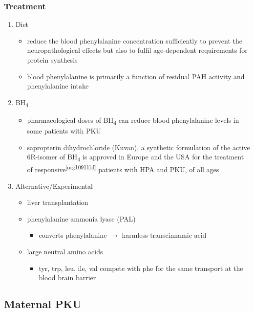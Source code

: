 \documentclass{scrartcl}
\begin{document}
\subsubsection{Treatment}
\label{sec:orgc63a69c}
\begin{enumerate}
\item Diet
\label{sec:orgd72f40e}
\begin{itemize}
\item reduce the blood phenylalanine concentration sufficiently to prevent the
neuropathological effects but also to fulfil age-dependent
requirements for protein synthesis
\item blood phenylalanine is primarily a function of residual PAH activity and phenylalanine
intake
\end{itemize}
\item BH\textsubscript{4}
\label{sec:org8cec840}
\begin{itemize}
\item pharmacological doses of BH\textsubscript{4} can reduce blood phenylalanine levels
in some patients with PKU
\item sapropterin dihydrochloride (Kuvan), a synthetic formulation of the
active 6R-isomer of BH\textsubscript{4} is approved in Europe and the USA for the
treatment of responsive\textsuperscript{\ref{org10911bf}} patients with HPA and PKU, of all
ages
\end{itemize}
\item Alternative/Experimental
\label{sec:orgfac6cfc}
\begin{itemize}
\item liver transplantation
\item phenylalanine ammonia lyase (PAL)
\begin{itemize}
\item converts phenylalanine \(\to\) harmless transcinnamic acid
\end{itemize}
\item large neutral amino acids
\begin{itemize}
\item tyr, trp, leu, ile, val compete with phe for the same transport at
the blood brain barrier
\end{itemize}
\end{itemize}
\end{enumerate}

\subsection{Maternal PKU}
\label{sec:org6d26d65}
\end{document}

